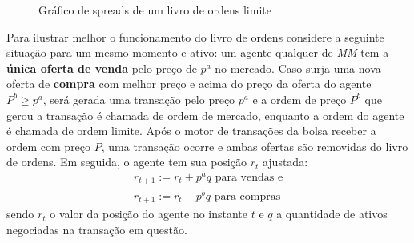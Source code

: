 \begin{figure}
	\begin{center}
	\end{center}
	\caption{Gráfico de spreads de um livro de ordens limite}
\end{figure}

Para ilustrar melhor o funcionamento do livro de ordens considere a seguinte situação para um mesmo momento e ativo: um agente qualquer de \textit{MM} tem a \textbf{única oferta de venda} pelo preço de $p^{a}$ no mercado. Caso surja uma nova oferta de \textbf{compra} com melhor preço e acima do preço da oferta do agente $P^{b} \geq p^{a}$, será gerada uma transação pelo preço $p^{a}$ e a ordem de preço $P^{b}$ que gerou a transação é chamada de ordem de mercado, enquanto a ordem do agente é chamada de ordem limite. Após o motor de transações da bolsa receber a ordem com preço $P$, uma transação ocorre e ambas ofertas são removidas do livro de ordens. Em seguida, o agente tem sua posição $r_{t}$ ajustada:
\begin{equation}
    \begin{aligned}
    	r_{t + 1}:= r_{t} + p^{a}q \text{ para vendas e} \\ 
    	r_{t + 1}:= r_{t} - p^{b}q \text{ para compras}
    \end{aligned}
\end{equation}
sendo $r_{t}$ o valor da posição do agente no instante $t$ e $q$ a quantidade de ativos negociadas na transação em questão.

